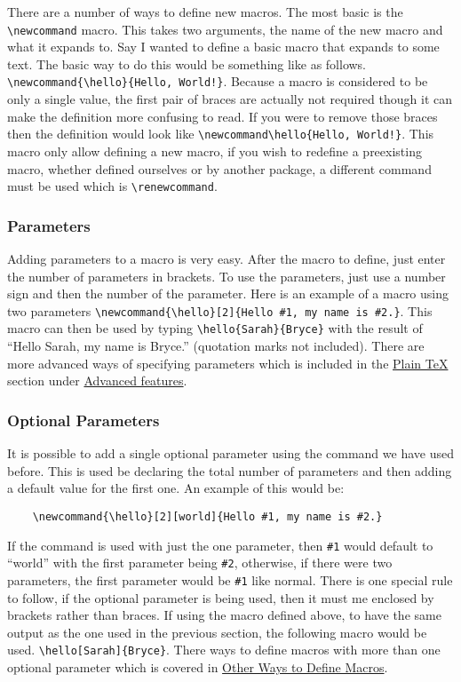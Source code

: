 There are a number of ways to define new macros. The most basic is the \verb=\newcommand= macro. This takes two arguments, the name of the new macro and what it expands to. Say I wanted to define a basic macro that expands to some text. The basic way to do this would be something like as follows. \verb=\newcommand{\hello}{Hello, World!}=. Because a macro is considered to be only a single value, the first pair of braces are actually not required though it can make the definition more confusing to read. If you were to remove those braces then the definition would look like \verb=\newcommand\hello{Hello, World!}=. This macro only allow defining a new macro, if you wish to redefine a preexisting macro, whether defined ourselves or by another package, a different command must be used which is \verb=\renewcommand=.
\subsubsection{Parameters}
Adding parameters to a macro is very easy. After the macro to define, just enter the number of parameters in brackets. To use the parameters, just use a number sign and then the number of the parameter. Here is an example of a macro using two parameters \verb=\newcommand{\hello}[2]{Hello #1, my name is #2.}=. This macro can then be used by typing \verb=\hello{Sarah}{Bryce}= with the result of \newcommand{\hello}[2]{Hello #1, my name is #2.}``\hello{Sarah}{Bryce}'' (quotation marks not included). There are more advanced ways of specifying parameters which is included in the \hyperref[section:programming/advancedFeatures/plainTeX]{Plain \TeX{}} section under \hyperref[section:programming/advancedFeatures]{Advanced features}.
\subsubsection{Optional Parameters}
It is possible to add a single optional parameter using the command we have used before. This is used be declaring the total number of parameters and then adding a default value for the first one. An example of this would be:
\begin{verbatim}
    \newcommand{\hello}[2][world]{Hello #1, my name is #2.}
\end{verbatim}
If the command is used with just the one parameter, then \verb=#1= would default to ``world'' with the first parameter being \verb=#2=, otherwise, if there were two parameters, the first parameter would be \verb=#1= like normal. There is one special rule to follow, if the optional parameter is being used, then it must me enclosed by brackets rather than braces. If using the macro defined above, to have the same output as the one used in the previous section, the following macro would be used. \verb=\hello[Sarah]{Bryce}=. There ways to define macros with more than one optional parameter which is covered in \hyperref[section:programming/macros/otherWays]{Other Ways to Define Macros}.
